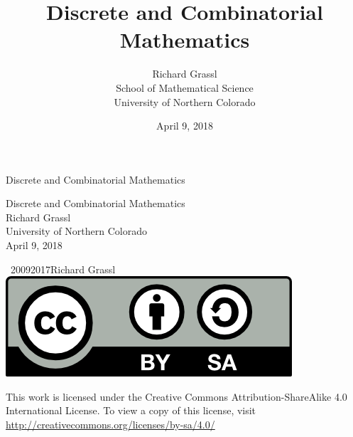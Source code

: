 \documentclass[10pt,]{book}
\title{Discrete and Combinatorial Mathematics}
\author{Richard Grassl\\
School of Mathematical Science\\
University of Northern Colorado
}
\date{April 9, 2018}
\theoremstyle{plain}
\theoremstyle{definition}
\theoremstyle{definition}
\numberwithin{equation}{chapter}
\begin{document}
\frontmatter
\thispagestyle{empty}
{\centering
\vspace*{0.28\textheight}
{\Huge Discrete and Combinatorial Mathematics}\\}
\clearpage
\thispagestyle{empty}
\null%
\clearpage
\thispagestyle{empty}
{\centering
\vspace*{0.14\textheight}
{\Huge Discrete and Combinatorial Mathematics}\\[3\baselineskip]
{\Large Richard Grassl}\\[0.5\baselineskip]
{\Large University of Northern Colorado}\\[3\baselineskip]
{\Large April 9, 2018}\\}
\clearpage
\thispagestyle{empty}
\hypertarget{colophon-1}{}
\noindent\textcopyright\ 2009\textendash{}2017\quad{}Richard Grassl\\[0.5\baselineskip]
\hypertarget{p-1}{}%
\includegraphics[width=0.15\linewidth]{../images/by-sa.png}
%
 \par
\hypertarget{p-2}{}%
This work is licensed under the Creative Commons Attribution-ShareAlike 4.0 International License. To view a copy of this license, visit \href{http://creativecommons.org/licenses/by-sa/4.0/}{http://creativecommons.org/licenses/by-sa/4.0/}%
\par\medskip
{}
\null\clearpage
\setcounter{tocdepth}{2}
\renewcommand*\contentsname{Contents}
\tableofcontents
\mainmatter
\typeout{************************************************}
\typeout{************************************************}
\end{document}
